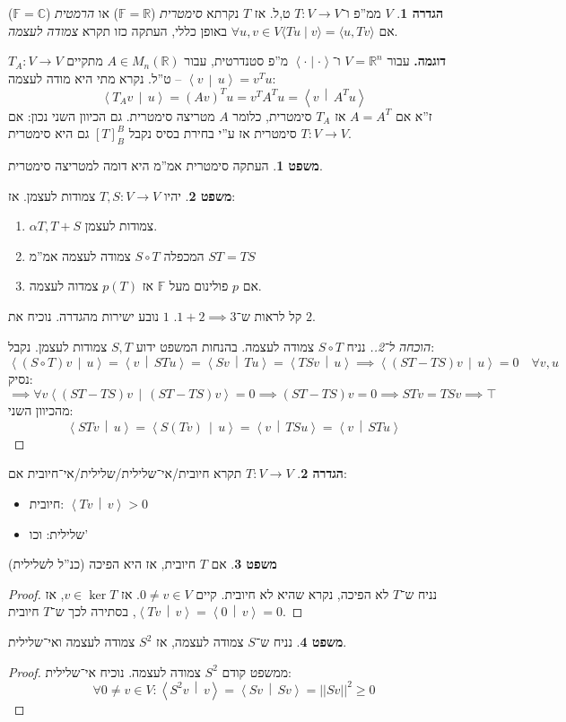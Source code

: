 \documentclass[a4paper]{article}
\newcommand\R     {\mathbb{R}}
\newcommand\C     {\mathbb{C}}
\newcommand\ra    {\rangle}
\newcommand\la    {\langle}
\newcommand\F         {\mathbb{F}}
\newcommand\co        {\colon}
\newcommand\norm[1]   {\left \vert \left \vert #1 \right \vert \right \vert}
\newcommand\smut      {\left \la \cdot \mid \cdot \right \ra}
\newcommand\mut [2]   {\left \la #1 \,\middle\vert\, #2 \right \ra}
\newcommand\ag        {\alpha}
\theoremstyle{definition}
\newtheorem{Theorem}{משפט}
\newtheorem{definition}{הגדרה}
\newcommand\theo  [1] {\begin{Theorem}#1\end{Theorem}}
\newcommand\defi  [1] {\begin{definition}#1\end{definition}}
\begin{document}
	\defi{$V$ ממ''פ ו־$T \co V \to V$ ט,ל. אז $T$ נקרתא \textit{סימטרית} ($\F = \R$) או \textit{הרמטית} ($\F = \C$) אם $\forall u, v \in V\la Tu \mid v \ra = \la u, Tv \ra$
		באופן כללי, העתקה כזו תקרא \textit{צמודה לעצמה}. }
	
	\textbf{דוגמה. }עבור $V = \R^{n}$ ו־$\smut $ מ''פ סטנדרטית, עבור $A \in M_n(\R)$ מתקיים $T_A \co V \to V$ ט''ל. נקרא מתי היא מודה לעצמה – $\mut{v}{u} = v^{T}u$: 
	\[ \mut{T_Av}{u} = (Av)^{T}u = v^{T}A^Tu = \mut{v}{A^{T}u} \]
	ז''א אם $A = A^{T}$ אז $T_A$ סימטרית, כלומר $A$ מטריצה סימטרית. גם הכיוון השני נכון: אם $T \co V \to V$ סימטרית אז ע''י בחירת בסיס נקבל $[T]^{B}_B$ גם היא סימטרית. 
	\theo{העתקה סימטרית אמ''מ היא דומה למטריצה סימטרית. }
	
	\theo{יהיו $T, S \co V \to V$ צמודות לעצמן. אז: 
		\begin{enumerate}
			\item $\ag T, T + S$ צמודות לעצמן. 
			\item המכפלה $S\circ T$ צמודה לעצמה אמ''מ $ST = TS$
			\item אם $p$ פולינום מעל $\F$ אז $p(T)$ צמדוה לעצמה. 
	\end{enumerate}}
	קל לראות ש־$1 + 2 \implies 3$. $1$ נובע ישירות מהגדרה. נוכיח את $2$. \begin{proof}[הוכחה ל־2.]
		נניח $S \circ T$ צמודה לעצמה. בהנחות המשפט ידוע $S, T$ צמודות לעצמן. נקבל: 
		\[ \mut{(S \circ T)v}{u} = \mut{v}{STu} = \mut{Sv}{Tu} = \mut{TSv}{u} \implies \mut{(ST - TS)v}{u} = 0 \quad \forall v, u \]
		נסיק: 
		\[ \implies \forall v\mut{(ST - TS)v}{(ST - TS)v} = 0  \implies (ST - TS)v = 0 \implies STv = TSv \implies \top \]
		מהכיוון השני: 
		\[ \mut{STv}{u} = \mut{S(Tv)}{u} = \mut{v}{TSu} = \mut{v}{STu} \]
	\end{proof}
	\defi{$T \co V \to V$ תקרא חיובית/אי־שלילית/שלילית/אי־חיובית אם: 
		\begin{itemize}
			\item חיובית: \hfil $\mut{Tv}{v} > 0$
			\item שלילית: וכו'
	\end{itemize}}
	\theo{אם $T$ חיובית, אז היא הפיכה (כנ''ל לשלילית)} \begin{proof}
		נניח ש־$T$ לא הפיכה, נקרא שהיא לא חיובית. קיים $0 \neq v \in V$. אז $v \in \ker T$, אז $\mut{Tv}{v} = \mut{0}{v} = 0$, בסתירה לכך ש־$T$ חיובית. 
	\end{proof}
	\theo{נניח ש־$S$ צמודה לעצמה, אז $S^{2}$ צמודה לעצמה ואי־שלילית. }
	\begin{proof}
		ממשפט קודם $S^{2}$ צמודה לעצמה. נוכיח אי־שלילית: 
		\[ \forall 0 \neq v \in V \co \mut{S^{2}v}{v} = \mut{Sv}{Sv} = \norm{Sv}^{2} \ge 0 \]
	\end{proof}
\end{document}
